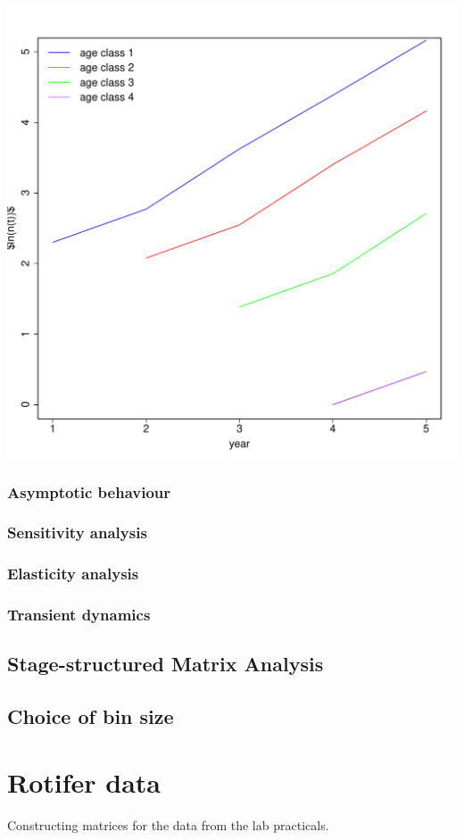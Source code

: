 \documentclass{article}\usepackage[]{graphicx}\usepackage[]{color}
\makeatletter
\def\maxwidth{ %
  \ifdim\Gin@nat@width>\linewidth
    \linewidth
  \else
    \Gin@nat@width
  \fi
}
\newenvironment{knitrout}{}{} %
\makeatother
\begin{document}
\begin{knitrout}
\color{fgcolor}
\includegraphics[width=\maxwidth]{figure/t3a} 

\end{knitrout}



\subsubsection{Asymptotic behaviour}

\subsubsection{Sensitivity analysis}

\subsubsection{Elasticity analysis}

\subsubsection{Transient dynamics}

\subsection{Stage-structured Matrix Analysis}

\subsection{Choice of bin size}
\section{Rotifer data}
Constructing matrices for the data from the lab practicals.
\shipoutAnswer
\end{document}
